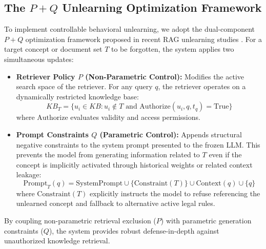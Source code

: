 \subsection{\texorpdfstring{The $P + Q$ Unlearning Optimization Framework}{The P + Q Unlearning Optimization Framework}}
To implement controllable behavioral unlearning, we adopt the dual-component $P+Q$ optimization framework proposed in recent RAG unlearning studies \parencite{11207222}. For a target concept or document set $T$ to be forgotten, the system applies two simultaneous updates:
\begin{itemize}
    \item \textbf{Retriever Policy $P$ (Non-Parametric Control):} Modifies the active search space of the retriever. For any query $q$, the retriever operates on a dynamically restricted knowledge base:
    \begin{equation}
        KB_{T} = \{u_i \in KB : u_i \notin T \text{ and } \text{Authorize}(u_i, q, t_q) = \text{True}\}
    \end{equation}
    where $\text{Authorize}$ evaluates validity and access permissions.
    \item \textbf{Prompt Constraints $Q$ (Parametric Control):} Appends structural negative constraints to the system prompt presented to the frozen LLM. This prevents the model from generating information related to $T$ even if the concept is implicitly activated through historical weights or related context leakage:
    \begin{equation}
        \text{Prompt}_{T}(q) = \text{SystemPrompt} \cup \{\text{Constraint}(T)\} \cup \text{Context}(q) \cup \{q\}
    \end{equation}
    where $\text{Constraint}(T)$ explicitly instructs the model to refuse referencing the unlearned concept and fallback to alternative active legal rules.
\end{itemize}

By coupling non-parametric retrieval exclusion ($P$) with parametric generation constraints ($Q$), the system provides robust defense-in-depth against unauthorized knowledge retrieval.

